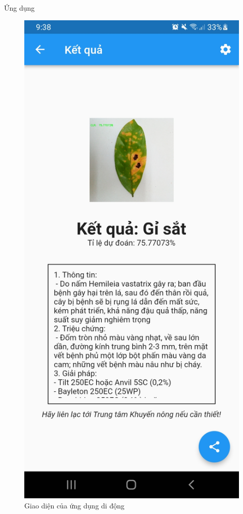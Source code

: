 \documentclass{beamer}
\begin{document}
\begin{frame}[allowframebreaks]{Ứng dụng}
\begin{figure}[H]
		\includegraphics[scale=0.1]{images/screenshot4.jpg}
		\caption{Giao diện của ứng dụng di động}
	\end{figure}

	\framebreak


\end{frame}
\end{document}
